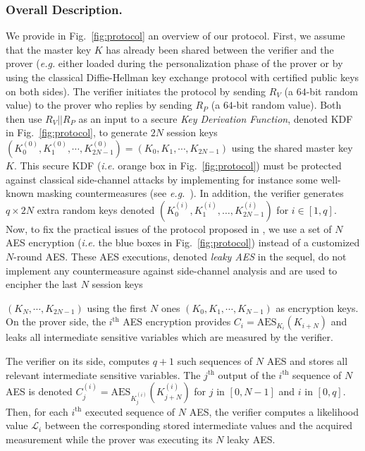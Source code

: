\subsubsection{Overall Description.}\label{sssec:overall}
We provide in Fig.~\ref{fig:protocol} an overview of our protocol. 
First, we assume that the master key $K$ has already been shared between the verifier and the prover (\emph{e.g.} either loaded during the personalization phase of the prover or by using the classical Diffie-Hellman key exchange protocol with certified public keys on both sides).
The verifier initiates the protocol by sending $R_V$ (a $64$-bit random value) to the prover who replies by sending $R_P$ (a $64$-bit random value). Both then use $R_V || R_P$ as an input to a secure \textit{Key Derivation Function}, denoted KDF in Fig.~\ref{fig:protocol}, to generate $2N$ session keys $(K_0^{(0)}, K_1^{(0)}, \cdots, K_{2N-1}^{(0)}) = (K_0, K_1, \cdots, K_{2N-1})$ using the shared master key $K$.
This secure KDF (\emph{i.e.} orange box in Fig.~\ref{fig:protocol}) must be protected against classical side-channel attacks by implementing for instance some well-known masking countermeasures (see \emph{e.g.}~\cite{DBLP:conf/eurocrypt/Coron14,DBLP:conf/ches/GenellePQ11,DBLP:conf/ches/RivainP10}). In addition, the verifier generates $q \times 2N$ extra random keys denoted $(K_0^{(i)}, K_1^{(i)}, \dots, K_{2N-1}^{(i)})$ for $i \in [1,q]$. Now, to fix the practical issues of the protocol proposed in \cite{SakiyamaMMKHMMN15}, we use a set of $N$ AES encryption (\emph{i.e.} the 	blue boxes in Fig.~\ref{fig:protocol}) instead of a customized $N$-round AES. 
These AES executions, denoted \textit{leaky AES} in the sequel, do not implement any countermeasure against side-channel analysis and are used to encipher the last $N$ session keys

$(K_N, \cdots, K_{2N-1})$ using the first $N$ ones $(K_0, K_1, \cdots, K_{N-1})$ as encryption keys.\newline
On the prover side, the $i^{\text{th}}$ AES encryption provides $C_i = \mbox{AES}_{K_i}(K_{i+N})$ and leaks all intermediate sensitive variables which are measured by the verifier.

The verifier on its side, computes $q+1$ such sequences of $N$ AES and stores all relevant intermediate sensitive variables. The $j^\text{th}$ output of the $i^\text{th}$ sequence of $N$ AES is denoted $C_j^{(i)} = \mbox{AES}_{K_j^{(i)}}(K_{j+N}^{(i)})$ for $j$ in $[0,N-1]$ and $i$ in $[0,q]$.
Then, for each $i^\text{th}$ executed sequence of $N$ AES, the verifier computes a likelihood value $\mathcal{L}_i$ between the corresponding stored intermediate values and the acquired measurement while the prover was executing its $N$ leaky AES.

